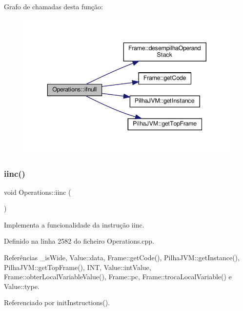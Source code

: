 Grafo de chamadas desta função\+:\nopagebreak
\begin{figure}[H]
\begin{center}
\leavevmode
\includegraphics[width=343pt]{classOperations_a030f5995f8f357254e543d0cbce2d189_cgraph}
\end{center}
\end{figure}
\mbox{\label{classOperations_a9934f9369192b10a978c7d6950592c42}} 
\subsubsection{\texorpdfstring{iinc()}{iinc()}}
{\footnotesize\ttfamily void Operations\+::iinc (\begin{DoxyParamCaption}{ }\end{DoxyParamCaption})\hspace{0.3cm}{\ttfamily [private]}}



Implementa a funcionalidade da instrução iinc. 



Definido na linha 2582 do ficheiro Operations.\+cpp.



Referências \+\_\+is\+Wide, Value\+::data, Frame\+::get\+Code(), Pilha\+J\+V\+M\+::get\+Instance(), Pilha\+J\+V\+M\+::get\+Top\+Frame(), I\+NT, Value\+::int\+Value, Frame\+::obter\+Local\+Variable\+Value(), Frame\+::pc, Frame\+::troca\+Local\+Variable() e Value\+::type.



Referenciado por init\+Instructions().

